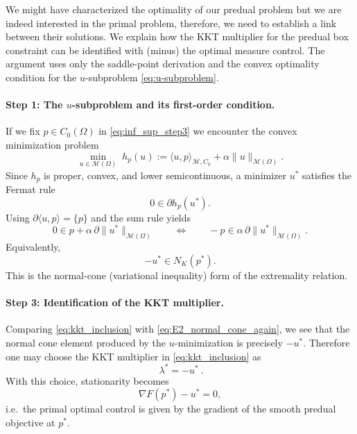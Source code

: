 \documentclass[11pt,a4paper]{article}
\begin{document}
We might have characterized the optimality of our predual problem but we are indeed interested in the primal problem, therefore, we need to establish a link between their solutions. We explain how the KKT multiplier for the predual box constraint can be identified with (minus) the optimal measure control. The argument uses only the saddle-point derivation and the convex optimality
condition for the $u$-subproblem \eqref{eq:u-subproblem}.

\paragraph{Step 1: The $u$-subproblem and its first-order condition.}
If we fix $p \in C_0(\Omega)$ in \ref{eq:inf_sup_step3} we encounter the convex minimization problem
\begin{equation}\label{eq:u_subproblem_again}
\min_{u\in\mathcal{M}(\Omega)}\;
h_p(u):=\langle u,p\rangle_{\mathcal{M},C_0}+\alpha\|u\|_{\mathcal{M}(\Omega)}.
\end{equation}
Since $h_p$ is proper, convex, and lower semicontinuous, a minimizer $u^*$ satisfies the Fermat rule
\[
0\in \partial h_p(u^*).
\]
Using $\partial\langle u,p\rangle=\{p\}$ and the sum rule yields
\begin{equation}\label{eq:E1_sign_correct_again}
0\in p+\alpha\,\partial\|u^*\|_{\mathcal{M}(\Omega)}
\qquad\Longleftrightarrow\qquad
-p\in \alpha\,\partial\|u^*\|_{\mathcal{M}(\Omega)}.
\end{equation}
Equivalently,
\begin{equation}\label{eq:E2_normal_cone_again}
-u^*\in N_K(p^*).
\end{equation}
This is the normal-cone (variational inequality) form of the extremality relation.

\paragraph{Step 3: Identification of the KKT multiplier.}
Comparing \eqref{eq:kkt_inclusion} with \eqref{eq:E2_normal_cone_again}, we see that the
normal cone element produced by the $u$-minimization is precisely $-u^*$.
Therefore one may choose the KKT multiplier in \eqref{eq:kkt_inclusion} as
\begin{equation}\label{eq:lambda_equals_minus_u}
\boxed{\ \lambda^*=-u^*\ }.
\end{equation}
With this choice, stationarity becomes
\[
\nabla F(p^*)-u^*=0,
\]
i.e.\ the primal optimal control is given by the gradient of the smooth predual objective at $p^*$.
\end{document}
